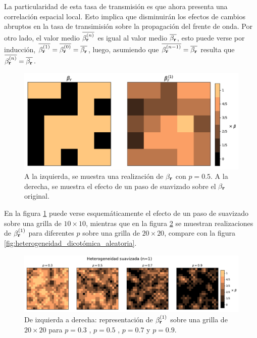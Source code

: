 La particularidad de esta
tasa de transmisión es que ahora presenta una correlación espacial local. Esto implica que disminuirán los efectos de cambios abruptos en la tasa de 
transimisión sobre la propagación del frente de onda. Por otro lado, el valor medio $\overline{\beta^{(n)}_{\vb r}}$ es igual al valor medio 
$\overline{\beta_{\vb r}}$, esto puede verse por inducción, $\overline{\beta^{(1)}_{\vb r}}=\overline{\beta^{(0)}_{\vb r}}=\overline{\beta_{\vb r}}$,
luego, asumiendo que $\overline{\beta^{(n-1)}_{\vb r}}=\overline{\beta_{\vb r}}$ resulta que $\overline{\beta^{(n)}_{\vb r}}=\overline{\beta_{\vb r}}$.
\begin{figure}[h]
  \centering
  \includegraphics[width=.65\textwidth]{smoth_step.pdf}
  \caption{A la izquierda, se muestra una realización de $\beta_{\vb r}$ con $p=0.5$. A la derecha, se muestra el efecto de un paso de suavizado 
  sobre el $\beta_{\vb r}$ original.}
  \label{fig:smoth_step}
\end{figure}

En la figura \ref{fig:smoth_step} puede verse esquemáticamente el efecto de un paso de suavizado sobre una grilla de $10\times10$, mientras que 
en la figura \ref{fig:smoth} se muestran realizaciones de $\beta^{(1)}_{\vb r}$ para diferentes $p$ sobre una grilla de $20\times20$, compare con 
la figura \ref{fig:heterogeneidad_dicotómica_aleatoria}.

\begin{figure}[h]
  \centering
  \includegraphics[width=1\textwidth]{het_suav.pdf}
  \caption{De izquierda a derecha: representación de $\beta^{(1)}_{\vb r}$ sobre una grilla de $20 \times 20$ para  $p=0.3$ , $p=0.5$ , $p=0.7$ y $p=0.9$.}
  \label{fig:smoth}
\end{figure}

